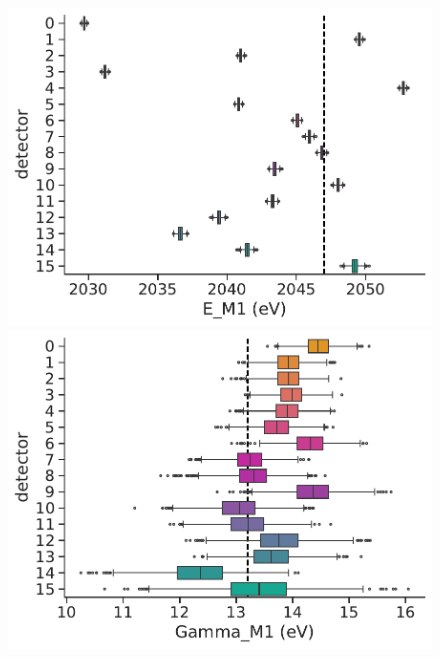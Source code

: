\begin{figure}[t]
  \centering
  \begin{minipage}{0.45\linewidth}
    \includegraphics[width=\linewidth]{figures/ch3/peaks/cat_plot_0.pdf}
  \end{minipage}
  \centering
  \begin{minipage}{0.45\linewidth}
    \includegraphics[width=\linewidth]{figures/ch3/peaks/cat_plot_1.pdf}
  \end{minipage}

\end{figure}
